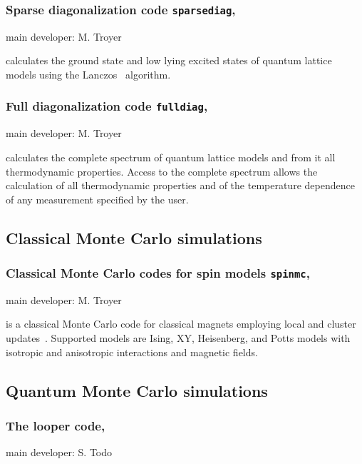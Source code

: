 \documentclass[12pt]{iopart}
\begin{document}
\subsubsection{Sparse diagonalization code {\tt sparsediag},} main developer: M. Troyer

\smallskip

 calculates the ground state and low lying excited states of quantum lattice models using the
Lanczos~\cite{lanczos} algorithm.


\subsubsection{Full diagonalization code {\tt fulldiag},} main developer: M. Troyer

\smallskip

 calculates the complete
spectrum of quantum lattice models and from it all thermodynamic
properties. Access to the complete spectrum allows the calculation of all thermodynamic properties and of the temperature dependence of any measurement specified by the user.



\subsection{Classical Monte Carlo simulations} 

\subsubsection{Classical Monte Carlo codes for spin models {\tt spinmc},} main developer: M. Troyer

\smallskip

 is a classical Monte Carlo code for classical magnets employing local and cluster
updates~\cite{Swendsen87,Wolff89}. Supported models are Ising, XY, Heisenberg, and Potts models with isotropic and anisotropic interactions and magnetic fields.

\subsection{Quantum Monte Carlo simulations} 

\subsubsection{The looper code,} main developer: S. Todo
\end{document}
